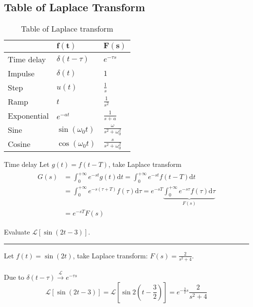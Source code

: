\subsection{Table of Laplace Transform} 
\begin{table}[H]
    \centering
    \caption{Table of Laplace transform}
    \begin{tabular}{p{3cm} p{3cm} p{3cm}}
        \toprule
        & $\boldsymbol{f(t)}$ & $\boldsymbol{F(s)}$\\ 
        \midrule
        Time delay  &       $ \delta(t-\tau)$ &     $\displaystyle e^{-\tau s}$ \\ [2ex] 
        Impulse     &       $\delta(t)$  &          $1$ \\ [2ex] 
        Step        &       $u(t)$ &                $\displaystyle \frac{1}{s}$  \\  [2ex] 
        Ramp        &       $t$ &                   $\displaystyle \frac{1}{s^{2}}$  \\ [2ex] 
        Exponential &       $e^{-at}$ &             $\displaystyle \frac{1}{s+a}$  \\ [2ex] 
        Sine        &       $\sin(\omega_{0} t)$ &  $\displaystyle \frac{\omega}{s^{2}+\omega_{0}^{2}}$\\ [2ex]
        Cosine      &       $\cos(\omega_{0} t)$ &  $\displaystyle \frac{s}{s^{2}+\omega_{0}^{2}}$ \\ [1.6ex]
        \bottomrule
    \end{tabular}
\end{table}

\begin{dv}{Time delay}
Let $g(t)=f(t-T)$, take Laplace transform
\begin{align*}
\begin{split}
    G(s) &= \int_{0}^{+\infty}e^{-st}g(t)\mathrm{d}t =  \int_{0}^{+\infty}e^{-st}f(t-T)\mathrm{d}t\\
    &= \int_{0}^{+\infty}e^{-s(\tau+T)}f(\tau)\mathrm{d}\tau = e^{-sT}\underbrace{\int_{0}^{+\infty}e^{-s\tau}f(\tau)\mathrm{d}\tau}_{F(s)} \\
    &= e^{-sT}F(s)
\end{split}
\end{align*}
\end{dv}
\begin{ex}{}
Evaluate $\mathcal{L}[\sin(2t-3)]$.
\vspace{.3cm} \hrule \vspace{.3cm} 
Let $f(t) = \sin(2t)$, take Laplace transform: $\displaystyle F(s) = \frac{2}{s^{2}+4}$.\\\\
Due to $\delta(t-\tau)  \xrightarrow{\mathcal{L}} e^{-\tau s}$
\[\mathcal{L}[\sin(2t-3)] = \mathcal{L}[\sin2(t-\frac{3}{2})] = e^{-\frac{3}{2}s}\frac{2}{s^{2}+4}\]
\end{ex}

